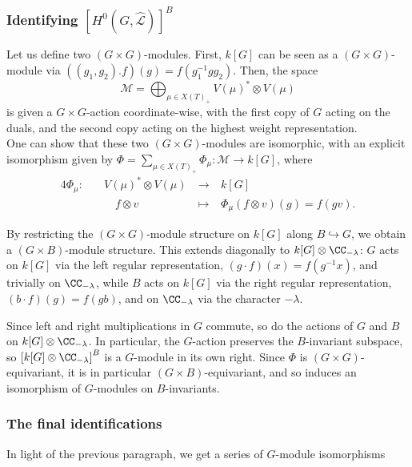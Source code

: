 \subsubsection[Identifying the sections]{Identifying ${\left[H^{0}\left(G, \hat{\mathcal{L}}\right)\right]}^B$}
Let us define two $(G \times G)$-modules. First, $k[G]$ can be seen as a $(G \times G)$-module via $((g_1, g_2).f)(g) = f(g_1^{-1} g g_2)$. Then, the space
\[ \mathcal{M} = \bigoplus_{\mu \in {X(T)}_+} {V(\mu)}^* \otimes V(\mu) \]
is given a $G \times G$-action coordinate-wise, with the first copy of $G$ acting on the duals, and the second copy acting on the highest weight representation. \\
One can show that these two $(G \times G)$-modules are isomorphic, with an explicit isomorphism given by $\Phi = \sum_{\mu \in {X(T)}_+} \Phi_\mu : \mathcal{M} \to k[G]$, where
\begin{alignat*}{4}
    \Phi_\mu: \quad & {V(\mu)}^* \otimes V(\mu) &\ \to\ & k[G]\\
           & \quad f \otimes v  &\ \mapsto\ & \Phi_\mu\left(f \otimes v \right)(g) = f(gv).
\end{alignat*}

By restricting the $(G \times G)$-module structure on $k[G]$ along 
$B \hookrightarrow G$, we obtain a $(G \times B)$-module structure. 
This extends diagonally to $k[G] \otimes \CC_{-\lambda}$: $G$ acts on 
$k[G]$ via the left regular representation, $(g \cdot f)(x) = f(g^{-1}x)$, 
and trivially on $\CC_{-\lambda}$, while $B$ acts on $k[G]$ via the right 
regular representation, $(b \cdot f)(g) = f(gb)$, and on $\CC_{-\lambda}$ 
via the character $-\lambda$.

Since left and right multiplications in $G$ commute, so do the 
actions of $G$ and $B$ on $k[G] \otimes \CC_{-\lambda}$. In particular, 
the $G$-action preserves the $B$-invariant subspace, so 
${\left[k[G] \otimes \CC_{-\lambda}\right]}^B$ is a $G$-module in its own 
right. Since $\Phi$ is $(G \times G)$-equivariant, it is in particular 
$(G \times B)$-equivariant, and so induces an isomorphism of $G$-modules 
on $B$-invariants.

\subsubsection{The final identifications}
In light of the previous paragraph, we get a series of $G$-module isomorphisms

